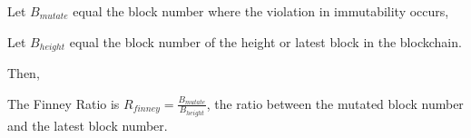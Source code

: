 \documentclass[english]{article}
\begin{document}
Let $B_{mutate}$ equal the block number where the violation in immutability
occurs,

Let $B_{height}$ equal the block number of the height or latest block
in the blockchain.

Then,

The Finney Ratio is $R_{finney}=\frac{B_{mutate}}{B_{height}}$, the
ratio between the mutated block number and the latest block number.
\end{document}
